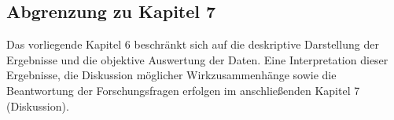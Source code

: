 \subsection{Abgrenzung zu Kapitel 7}
Das vorliegende Kapitel 6 beschränkt sich auf die deskriptive Darstellung der Ergebnisse und die objektive Auswertung der Daten. Eine Interpretation dieser Ergebnisse, die Diskussion möglicher Wirkzusammenhänge sowie die Beantwortung der Forschungsfragen erfolgen im anschließenden Kapitel 7 (Diskussion).
